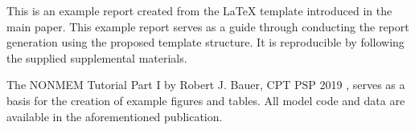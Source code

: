 This is an example report created from the \LaTeX{} template introduced in the main paper. This example report serves as a guide through conducting the report generation using the proposed template structure. It is reproducible by following the supplied supplemental materials.

The \gls{NONMEM} Tutorial Part I by Robert J. Bauer, CPT PSP 2019 \autocite{Bauer2019}, serves as a basis for the creation of example figures and tables. All model code and data are available in the aforementioned publication. 

 
